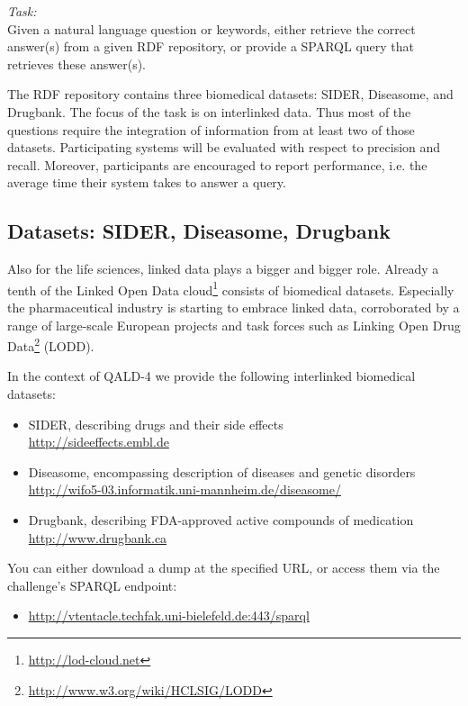 
\emph{Task:} \\
Given a natural language question or keywords, either retrieve the correct answer(s) from a given RDF repository, or provide a SPARQL query that retrieves these answer(s). 

The RDF repository contains three biomedical datasets: SIDER, Diseasome, and Drugbank. 
The focus of the task is on interlinked data. Thus most of the questions require the integration of information from at least two of those datasets. 
Participating systems will be evaluated with respect to precision and recall. 
Moreover, participants are encouraged to report performance, i.e. the average time their system takes to answer a query.


\subsection{Datasets: SIDER, Diseasome, Drugbank}

Also for the life sciences, linked data plays a bigger and bigger role. Already a tenth of the Linked Open Data 
cloud\footnote{\url{http://lod-cloud.net}} consists of biomedical datasets.
Especially the pharmaceutical industry is starting to embrace linked data, corroborated by a range of large-scale 
European projects and task forces such as Linking Open Drug Data\footnote{\url{http://www.w3.org/wiki/HCLSIG/LODD}} (LODD).

In the context of QALD-4 we provide the following interlinked biomedical datasets:
  \begin{itemize}
  \item SIDER, describing drugs and their side effects\\ \url{http://sideeffects.embl.de}
  \item Diseasome, encompassing description of diseases and genetic disorders\\ \url{http://wifo5-03.informatik.uni-mannheim.de/diseasome/}
  \item Drugbank, describing FDA-approved active compounds of medication\\ \url{http://www.drugbank.ca}
  \end{itemize}
You can either download a dump at the specified URL, or access them via the challenge's SPARQL endpoint:
\begin{itemize} 
\item[] \url{http://vtentacle.techfak.uni-bielefeld.de:443/sparql}
\end{itemize}


